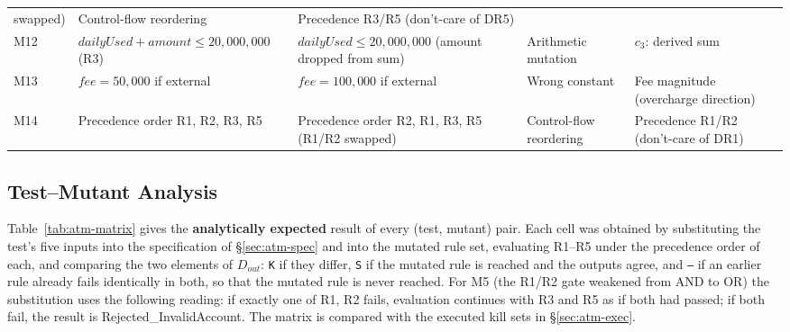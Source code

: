 \documentclass[11pt,a4paper]{article}
\begin{document}
\begin{xltabular}{\textwidth}{@{}l L{3.5cm} L{3.7cm} L{2.0cm} Y@{}}
swapped) & Control-flow reordering & Precedence R3/R5 (don't-care of DR5) \\
M12 & \(\mathit{dailyUsed}+\mathit{amount}\le 20{,}000{,}000\) (R3) &
\(\mathit{dailyUsed}\le 20{,}000{,}000\) (amount dropped from sum) &
Arithmetic mutation & \(c_3\): derived sum \\
M13 & \(\mathit{fee}=50{,}000\) if external &
\(\mathit{fee}=100{,}000\) if external & Wrong constant & Fee magnitude
(overcharge direction) \\
M14 & Precedence order R1, R2, R3, R5 & Precedence order R2, R1, R3, R5 (R1/R2
swapped) & Control-flow reordering & Precedence R1/R2 (don't-care of DR1) \\
\end{xltabular}
\endgroup

\subsection{Test--Mutant Analysis}
\label{sec:atm-matrix}

Table~\ref{tab:atm-matrix} gives the \textbf{analytically expected} result
of every (test, mutant) pair. Each cell was obtained by substituting the
test's five inputs into the specification of \S\ref{sec:atm-spec} and into
the mutated rule set, evaluating R1--R5 under the precedence order of each,
and comparing the two elements of \(D_{out}\): \texttt{K} if they differ,
\texttt{S} if the mutated rule is reached and the outputs agree, and
\texttt{--} if an earlier rule already fails identically in both, so that the
mutated rule is never reached. For M5 (the R1/R2 gate weakened from AND to
OR) the substitution uses the following reading: if exactly one of R1, R2
fails, evaluation continues with R3 and R5 as if both had passed; if both
fail, the result is Rejected\_InvalidAccount. The matrix is compared with the
executed kill sets in \S\ref{sec:atm-exec}.
\end{document}
